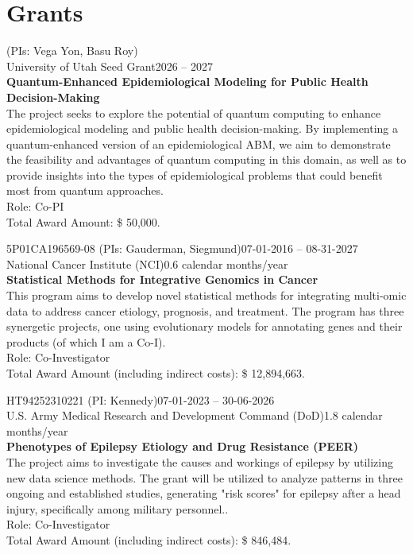\documentclass[letterpaper, 10pt]{article}
\renewcommand{\textbf}[1]{{\bfseries\color{teal}#1}}
\begin{document}
\section*{Grants}

\noindent (PIs: Vega Yon, Basu Roy)\\
University of Utah Seed Grant\hfill 2026 -- 2027\\
\textbf{Quantum-Enhanced Epidemiological Modeling for Public Health
Decision-Making} \\
The project seeks to explore the potential of quantum computing to enhance epidemiological modeling and public health decision-making. By implementing a quantum-enhanced version of an epidemiological ABM, we aim to demonstrate the feasibility and advantages of quantum computing in this domain, as well as to provide insights into the types of epidemiological problems that could benefit most from quantum approaches.\\
Role: Co-PI\\
Total Award Amount: \$ 50,000. \vspace{.5cm}


\noindent 5P01CA196569-08 (PIs: Gauderman, Siegmund)\hfill 07-01-2016 -- 08-31-2027\\
National Cancer Institute (NCI)\hfill 0.6 calendar months/year\\
\textbf{Statistical Methods for Integrative Genomics in Cancer}\\
This program aims to develop novel statistical methods for integrating multi-omic data to address cancer etiology, prognosis, and treatment. The program has three synergetic projects, one using evolutionary models for annotating genes and their products (of which I am a Co-I). \\
Role: Co-Investigator\\
Total Award Amount (including indirect costs): \$ 12,894,663. \vspace{.5cm}

\noindent HT94252310221 (PI: Kennedy)\hfill 07-01-2023 -- 30-06-2026\\
U.S. Army Medical Research and Development Command (DoD)\hfill 1.8 calendar months/year\\
\textbf{Phenotypes of Epilepsy Etiology and Drug Resistance (PEER)}\\
The project aims to investigate the causes and workings of epilepsy by utilizing new data science methods. The grant will be utilized to analyze patterns in three ongoing and established studies, generating "risk scores" for epilepsy after a head injury, specifically among military personnel..\\
Role: Co-Investigator\\
Total Award Amount (including indirect costs): \$ 846,484. \vspace{.5cm}
\end{document}
